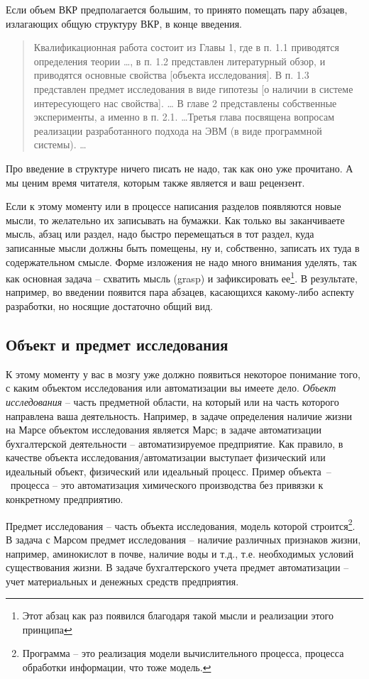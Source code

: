 \documentclass[a4paper,14pt,final]{extreport}
\begin{document}
Если объем ВКР предполагается большим, то принято помещать пару абзацев, излагающих общую структуру ВКР, в конце введения.

\begin{quote}
  Квалификационная работа состоит из Главы 1, где в п. 1.1 приводятся определения теории \ldots{}, в п. 1.2 представлен литературный обзор, и приводятся основные свойства [объекта исследования].  В п. 1.3 представлен предмет исследования в виде гипотезы [о наличии в системе интересующего нас свойства].  \ldots{} В главе 2 представлены собственные эксперименты, а именно в п. 2.1. \ldots Третья глава посвящена вопросам реализации разработанного подхода на ЭВМ (в виде программной системы).  \ldots{}
 \end{quote}
Про введение в структуре ничего писать не надо, так как оно уже прочитано.  А мы ценим время читателя, которым также является и ваш рецензент.

Если к этому моменту или в процессе написания разделов появляются новые мысли, то желательно их записывать на бумажки.  Как только вы заканчиваете мысль, абзац или раздел, надо быстро перемещаться в тот раздел, куда записанные мысли должны быть помещены, ну и, собственно, записать их туда в содержательном смысле.  Форме изложения не надо много внимания уделять, так как основная задача -- схватить мысль (grasp) и зафиксировать ее\footnote{Этот абзац как раз появился благодаря такой мысли и реализации этого принципа}.  В результате, например, во введении появится пара абзацев, касающихся какому-либо аспекту разработки, но носящие достаточно общий вид.

\subsection{Объект и предмет исследования}
К этому моменту у вас в мозгу уже должно появиться некоторое понимание того, с каким объектом исследования или автоматизации вы имеете дело.  \emph{Объект исследования} -- часть предметной области, на который или на часть которого направлена ваша деятельность.  Например, в задаче определения наличие жизни на Марсе объектом исследования является Марс; в задаче автоматизации бухгалтерской деятельности -- автоматизируемое предприятие.  Как правило, в качестве объекта исследования/автоматизации выступает физический или идеальный объект, физический или идеальный процесс.  Пример объекта~--~процесса -- это автоматизация химического производства без привязки к конкретному предприятию.

Предмет исследования -- часть объекта исследования, модель которой строится\footnote{Программа -- это реализация модели вычислительного процесса, процесса обработки информации, что тоже модель.}.  В задача с Марсом предмет исследования -- наличие различных признаков жизни, например, аминокислот в почве, наличие воды и т.д., т.е. необходимых условий существования жизни.  В задаче бухгалтерского учета предмет автоматизации -- учет материальных и денежных средств предприятия.
\end{document}
